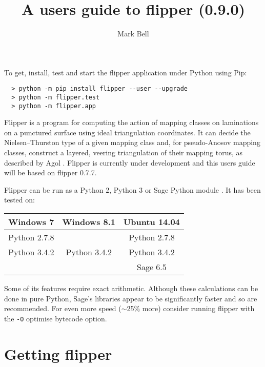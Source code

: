 \documentclass[a4paper]{article}
\title{A users guide to flipper (0.9.0)}
\author{Mark Bell}
\begin{document}
\maketitle

\begin{center}
\begin{minipage}{0.8\linewidth}
\begin{framed}
  To get, install, test and start the flipper application under Python using Pip:
  \begin{lstlisting}
  > python -m pip install flipper --user --upgrade
  > python -m flipper.test
  > python -m flipper.app
  \end{lstlisting}
\end{framed}
\end{minipage}
\end{center}

Flipper is a program for computing the action of mapping classes on laminations on a punctured surface using ideal triangulation coordinates. It can decide the Nielsen--Thurston type of a given mapping class and, for pseudo-Anosov mapping classes, construct a layered, veering triangulation of their mapping torus, as described by Agol \cite{Agol}. Flipper is currently under development and this users guide will be based on flipper 0.7.7.

Flipper can be run as a Python 2, Python 3 or Sage Python module \cite{sage}. It has been tested on:

\begin{center}
\begin{tabular}{c|c|c}
Windows 7 & Windows 8.1 & Ubuntu 14.04 \\
\hline
Python 2.7.8 & & Python 2.7.8 \\
Python 3.4.2 & Python 3.4.2 & Python 3.4.2 \\
 & & Sage 6.5 \\
\end{tabular}
\end{center}

Some of its features require exact arithmetic. Although these calculations can be done in pure Python, Sage's libraries appear to be significantly faster and so are recommended. For even more speed ($\sim$25\% more) consider running flipper with the \texttt{-O} optimise bytecode option.

\section{Getting flipper}
\end{document}
